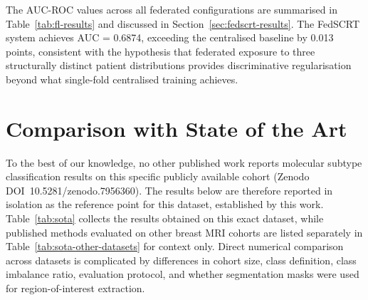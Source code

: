 The AUC-ROC values across all federated configurations
are summarised in Table~\ref{tab:fl-results} and
discussed in Section~\ref{sec:fedscrt-results}.
The FedSCRT system achieves AUC = 0.6874, exceeding
the centralised baseline by 0.013 points, consistent
with the hypothesis that federated exposure to three
structurally distinct patient distributions provides
discriminative regularisation beyond what single-fold
centralised training achieves.

\section{Comparison with State of the Art}
\label{sec:sota-comparison}

To the best of our knowledge, no other published
work reports molecular subtype classification results
on this specific publicly available cohort
(Zenodo DOI~10.5281/zenodo.7956360).
The results below are therefore reported in isolation
as the reference point for this dataset, established
by this work.
Table~\ref{tab:sota} collects the results obtained on
this exact dataset, while published methods evaluated
on other breast MRI cohorts are listed separately in
Table~\ref{tab:sota-other-datasets} for context only.
Direct numerical comparison across datasets is
complicated by differences in cohort size, class
definition, class imbalance ratio, evaluation protocol,
and whether segmentation masks were used for
region-of-interest extraction.

\begin{table}[htbp]
  \centering
  \caption{Comparison with published results using the
    \emph{same} dataset (Zenodo DOI 10.5281/zenodo.7956360,
    Alves and Boulogne 2023, Duke Hospital cohort).
    Methods using other breast MRI cohorts are listed
    separately in Table~\ref{tab:sota-other-datasets} for
    context only, as their numbers are not directly
    comparable due to differing cohort size, class
    imbalance, and acquisition protocol.}
  \label{tab:sota}
  \renewcommand{\arraystretch}{1.3}
\end{table}

